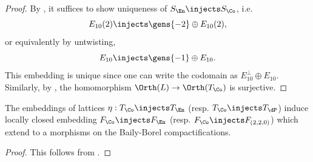 \documentclass[../../main.tex]{subfiles}
\begin{document}
\begin{proof}
By \cite[Lem. 2.4]{AEGS23}, it suffices to show uniqueness of $S_{\En} \injects S_{\Co}$, i.e.
\[
E_{10}(2) \injects \gens{-2}\oplus E_{10}(2)
,\]
or equivalently by untwisting,
\[
E_{10} \injects \gens{-1}\oplus E_{10}
.\]
This embedding is unique since one can write the codomain as $E_{10}^\perp \oplus E_{10}$. Similarly, by \cite[Cor. 1.5.2,\, Thm. 3.6.3]{Nik79}, the homomorphism $\Orth(L)\to \Orth(T_\Co)$ is surjective.
\end{proof}

\begin{lemma}\label{lem:locally_closed_embedding_BB}
The embeddings of lattices $\eta: T_\Co\injects T_\En$ (resp. $T_{\Co} \injects T_{\dP}$) induce locally closed embedding $F_\Co \injects F_\En$ (resp. $F_{\Co} \injects F_{(2,2,0)}$) which extend to a morphisms on the Baily-Borel compactifications.
\end{lemma}
\begin{proof}
This follows from \cite[\S 5, Thm.2]{KK72}.
\end{proof}
\end{document}
